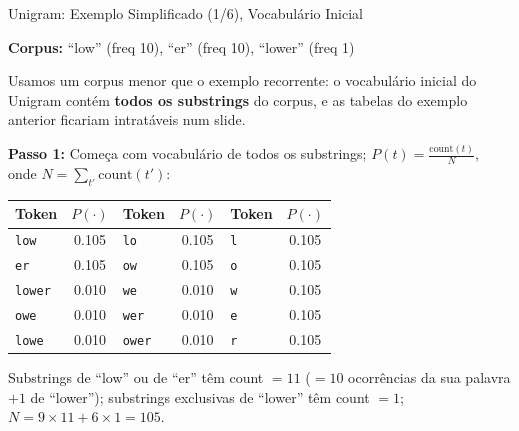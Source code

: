 \documentclass[aspectratio=169,xcolor=dvipsnames]{beamer}
\begin{document}
\begin{frame}{Unigram: Exemplo Simplificado (1/6), Vocabulário Inicial}

\textbf{Corpus:} ``low'' (freq 10), ``er'' (freq 10), ``lower'' (freq 1)

\vspace{2pt}
{\footnotesize Usamos um corpus menor que o exemplo recorrente: o vocabulário inicial do Unigram contém \textbf{todos os substrings} do corpus, e as tabelas do exemplo anterior ficariam intratáveis num slide.}

\vspace{6pt}

\textbf{Passo 1:} Começa com vocabulário de todos os substrings; $P(t) = \tfrac{\text{count}(t)}{N}$, onde $N = \sum_{t'}\text{count}(t')$:

\begin{center}
\small
\renewcommand{\arraystretch}{1.1}
\begin{tabular}{lclclc}
\toprule
\textbf{Token} & $P(\cdot)$ & \textbf{Token} & $P(\cdot)$ & \textbf{Token} & $P(\cdot)$ \\
\midrule
\texttt{low}   & 0.105 & \texttt{lo}   & 0.105 & \texttt{l} & 0.105 \\
\texttt{er}    & 0.105 & \texttt{ow}   & 0.105 & \texttt{o} & 0.105 \\
\texttt{lower} & 0.010 & \texttt{we}   & 0.010 & \texttt{w} & 0.105 \\
\texttt{owe}   & 0.010 & \texttt{wer}  & 0.010 & \texttt{e} & 0.105 \\
\texttt{lowe}  & 0.010 & \texttt{ower} & 0.010 & \texttt{r} & 0.105 \\
\bottomrule
\end{tabular}
\end{center}

{\footnotesize Substrings de ``low'' ou de ``er'' têm count $= 11$ ($= 10$ ocorrências da sua palavra $+ 1$ de ``lower''); substrings exclusivas de ``lower'' têm count $= 1$; $N = 9{\times}11 + 6{\times}1 = 105$.}

\end{frame}

\end{document}
